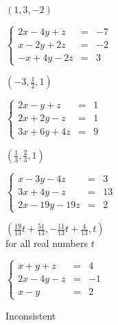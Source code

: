 \documentclass{ximera}
\begin{document}
\begin{question}
\begin{problem}
\begin{solution}
$(1,3,-2)$
\end{solution}
\end{problem}

\begin{problem}
$\left\{ \begin{array}{rcr} 2x-4y+z & = & -7 \\ x-2y+2z & = & -2 \\ -x+4y-2z & = & 3  \end{array} \right.$

\begin{solution}
$\left(-3,\frac{1}{2},1\right)$
\end{solution}
\end{problem}

\begin{problem}
$\left\{ \begin{array}{rcr} 2x-y+z & = & 1 \\ 2x+2y-z & = & 1 \\ 3x+6y+4z & = & 9  \end{array} \right.$

\begin{solution}
$\left(\frac{1}{3},\frac{2}{3},1\right)$
\end{solution}
\end{problem}

\begin{problem}
$\left\{ \begin{array}{rcr} x-3y-4z & = & 3 \\ 3x+4y-z & = & 13 \\ 2x-19y-19z & = & 2  \end{array} \right.$

\begin{solution}
$\left(\frac{19}{13} t + \frac{51}{13},-\frac{11}{13} t+\frac{4}{13},t\right)$\\
for all real numbers $t$
\end{solution}
\end{problem}


\begin{problem}
$\left\{ \begin{array}{rcr} x+y+z & = & 4 \\ 2x-4y-z& = & -1 \\ x-y & = & 2 \end{array} \right.$

\begin{solution}
Inconsistent
\end{solution}
\end{problem}


\end{question}
\end{document}
